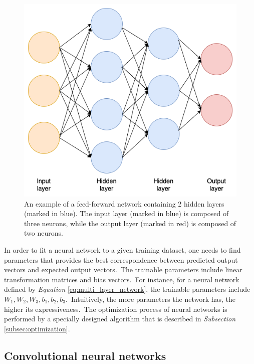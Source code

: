 \documentclass[longabstract, english, mgr]{iithesis}
\theoremstyle{default_theorem_style}\newtheorem{theorem}{Theorem}
\theoremstyle{default_theorem_style}\newtheorem{definition}{Definition}
\begin{document}
\begin{figure}[t]
\centering
\includegraphics[scale=0.45]{neural_network}
\caption{An example of a feed-forward network containing 2 hidden layers (marked in blue). The input layer
(marked in blue) is composed of three neurons, while the output layer (marked in red) is composed of two neurons.}
\label{fig:neural_network}
\end{figure}

\noindent In order to fit a neural network to a given training dataset, one needs to find parameters that provides the
best correspondence between predicted output vectors and expected output vectors.\ The trainable parameters include
linear transformation matrices and bias vectors.\ For instance, for a neural network defined by
\textit{Equation} \ref{eq:multi_layer_network}, the trainable parameters include
$W_1, W_2, W_3, b_1, b_2, b_3$.\ Intuitively, the more parameters the network has, the higher its expressiveness.\ The
optimization process of neural networks is performed by a specially designed algorithm that is
described in \textit{Subsection} \ref{subsec:optimization}.

\subsection{Convolutional neural networks}
\end{document}
